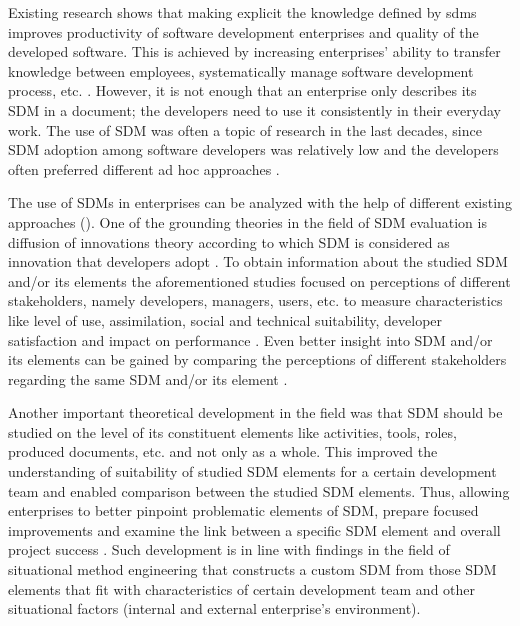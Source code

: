 





Existing research shows that making explicit the knowledge defined by \glspl{sdm} improves productivity of software development enterprises and quality of the developed software. This is achieved by increasing enterprises’ ability to transfer knowledge between employees, systematically manage software development process, etc. \citep{avison2003information,DBLP:journals/iam/Fitzgerald98,hovelja2015exploring,DBLP:journals/tse/RiemenschneiderHD02}. However, it is not enough that an enterprise only describes its SDM in a document; the developers need to use it consistently in their everyday work. The use of SDM was often a topic of research in the last decades, since SDM adoption among software developers was relatively low and the developers often preferred different ad hoc approaches \citep{DBLP:journals/software/Aaen03,DBLP:journals/isj/Fitzgerald96,DBLP:journals/iam/HuismanI06}. 

The use of SDMs in enterprises can be analyzed with the help of different existing approaches (\citealp{DBLP:journals/imds/Aboelmaged10,venkatesh2000theoretical,DBLP:journals/behaviourIT/WangLH13}). One of the grounding theories in the field of SDM evaluation is diffusion of innovations theory \citep{DBLP:books/daglib/0012785} according to which SDM is considered as innovation that developers adopt \citep{DBLP:journals/iam/Gallivan03,DBLP:journals/infsof/GreenHC05,DBLP:conf/caise/IivariH01}. To obtain information about the studied SDM and/or its elements the aforementioned studies focused on perceptions of different stakeholders, namely developers, managers, users, etc. to measure characteristics like level of use, assimilation, social and technical suitability, developer satisfaction and impact on performance \citep{atkinson1999project,cooper1990information,DBLP:books/daglib/0012785,DBLP:journals/infsof/VavpoticB09,DBLP:journals/comsis/VavpoticH12}. Even better insight into SDM and/or its elements can be gained by comparing the perceptions of different stakeholders regarding the same SDM and/or its element \citep{hovelja2015exploring}. 

Another important theoretical development in the field was that SDM should be studied on the level of its constituent elements like activities, tools, roles, produced documents, etc. and not only as a whole. This improved the understanding of suitability of studied SDM elements for a certain development team and enabled comparison between the studied SDM elements. Thus, allowing enterprises to better pinpoint problematic elements of SDM, prepare focused improvements and examine the link between a specific SDM element and overall project success \citep{atkinson1999project,hovelja2015exploring}. Such development is in line with findings in the field of situational method engineering \citep{DBLP:journals/ejis/KarlssonA09,DBLP:conf/caise/RalyteDR03} that constructs a custom SDM from those SDM elements that fit with characteristics of certain development team and other situational factors (internal and external enterprise’s environment). 

